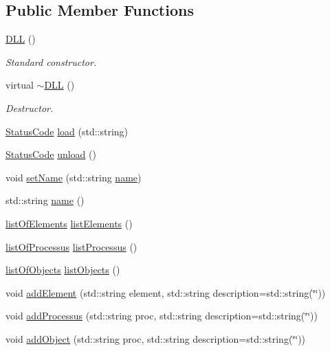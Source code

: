 \subsection*{Public Member Functions}
\begin{DoxyCompactItemize}
\item 
\hyperlink{classDLL_a78a22a98025697c4862ffc2a7cfcb648}{D\+LL} ()
\begin{DoxyCompactList}\small\item\em Standard constructor. \end{DoxyCompactList}\item 
virtual \hyperlink{classDLL_aff5b45d4b57b97144d4b49bc05aa0ddd}{$\sim$\+D\+LL} ()
\begin{DoxyCompactList}\small\item\em Destructor. \end{DoxyCompactList}\item 
\hyperlink{classStatusCode}{Status\+Code} \hyperlink{classDLL_a64166d3479edf7e44fd539841e70fb3a}{load} (std\+::string)
\item 
\hyperlink{classStatusCode}{Status\+Code} \hyperlink{classDLL_a10147aebd7b2688354f8c372d468d4aa}{unload} ()
\item 
void \hyperlink{classDLL_afc65a270b32a08d0681819cf2317aef0}{set\+Name} (std\+::string \hyperlink{classDLL_a0a915d538771dde2cb0580cd340ee088}{name})
\item 
std\+::string \hyperlink{classDLL_a0a915d538771dde2cb0580cd340ee088}{name} ()
\item 
\hyperlink{classDLL_a36792635c3cd36adbaaef2ff7152046e}{list\+Of\+Elements} \hyperlink{classDLL_adc96628c3ffd637827615fb5a3c71119}{list\+Elements} ()
\item 
\hyperlink{classDLL_aded1b0bb41b288ed4f34cb6d6632d486}{list\+Of\+Processus} \hyperlink{classDLL_a52eb21bf2ac1a61ae8ae41663ce4c3f8}{list\+Processus} ()
\item 
\hyperlink{classDLL_a68629aa6f9103c5a3082511ff8218b1e}{list\+Of\+Objects} \hyperlink{classDLL_a3bde9f46fc00bcc1b0a22558cf0447da}{list\+Objects} ()
\item 
void \hyperlink{classDLL_ac6528d0e965139d0830868fe8cace775}{add\+Element} (std\+::string element, std\+::string description=std\+::string(\char`\"{}\char`\"{}))
\item 
void \hyperlink{classDLL_a1f08b909c1569631b6b6b84b52409e33}{add\+Processus} (std\+::string proc, std\+::string description=std\+::string(\char`\"{}\char`\"{}))
\item 
void \hyperlink{classDLL_a76bd3e49e5e0046b017aa18afdc55a41}{add\+Object} (std\+::string proc, std\+::string description=std\+::string(\char`\"{}\char`\"{}))

\end{DoxyCompactItemize}
